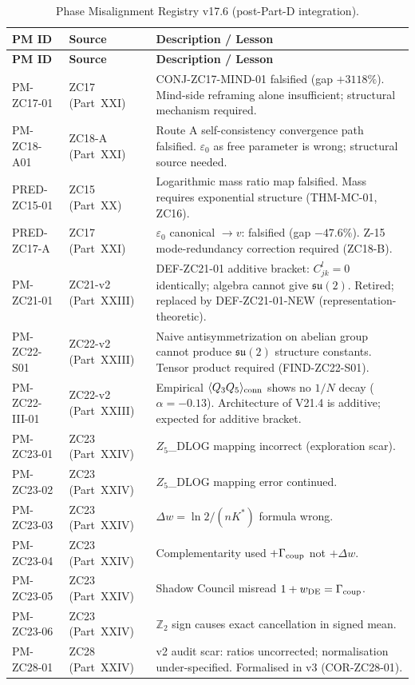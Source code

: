\documentclass[12pt, a4paper]{article}
\begin{document}
{\small
\renewcommand{\arraystretch}{1.30}
\begin{longtable}{>{\raggedright\arraybackslash}p{2.5cm}
                  >{\raggedright\arraybackslash}p{4.0cm}
                  >{\raggedright\arraybackslash}p{6.5cm}}
\caption{Phase Misalignment Registry v17.6 (post-Part-D integration).}\\
\toprule
\textbf{PM ID} & \textbf{Source} & \textbf{Description / Lesson} \\
\midrule
\endfirsthead
\toprule
\textbf{PM ID} & \textbf{Source} & \textbf{Description / Lesson} \\
\midrule
\endhead
\bottomrule
\endlastfoot
PM-ZC17-01 & ZC17 (Part~XXI) &
  CONJ-ZC17-MIND-01 falsified (gap $+3118\%$).
  Mind-side reframing alone insufficient; structural mechanism required. \\
PM-ZC18-A01 & ZC18-A (Part~XXI) &
  Route A self-consistency convergence path falsified.
  $\varepsilon_0$ as free parameter is wrong; structural source needed. \\
PRED-ZC15-01 & ZC15 (Part~XX) &
  Logarithmic mass ratio map falsified.
  Mass requires exponential structure (THM-MC-01, ZC16). \\
PRED-ZC17-A & ZC17 (Part~XXI) &
  $\varepsilon_0$ canonical $\to v$: falsified (gap $-47.6\%$).
  Z-15 mode-redundancy correction required (ZC18-B). \\
\midrule
PM-ZC21-01 & ZC21-v2 (Part~XXIII) &
  DEF-ZC21-01 additive bracket: $C_{jk}^l = 0$ identically;
  algebra cannot give $\mathfrak{su}(2)$. Retired; replaced by
  DEF-ZC21-01-NEW (representation-theoretic). \\
PM-ZC22-S01 & ZC22-v2 (Part~XXIII) &
  Naive antisymmetrization on abelian group cannot produce
  $\mathfrak{su}(2)$ structure constants. Tensor product required
  (FIND-ZC22-S01). \\
PM-ZC22-III-01 & ZC22-v2 (Part~XXIII) &
  Empirical $\langle Q_3 Q_5\rangle_{\rm conn}$ shows no $1/N$ decay
  ($\alpha = -0.13$). Architecture of V21.4 is additive; expected
  for additive bracket. \\
PM-ZC23-01 & ZC23 (Part~XXIV) &
  $Z_5$\_DLOG mapping incorrect (exploration scar). \\
PM-ZC23-02 & ZC23 (Part~XXIV) &
  $Z_5$\_DLOG mapping error continued. \\
PM-ZC23-03 & ZC23 (Part~XXIV) &
  $\Delta w = \ln 2/(nK^*)$ formula wrong. \\
PM-ZC23-04 & ZC23 (Part~XXIV) &
  Complementarity used $+\Gamma_{\rm coup}$ not $+\Delta w$. \\
PM-ZC23-05 & ZC23 (Part~XXIV) &
  Shadow Council misread $1 + w_{\rm DE} = \Gamma_{\rm coup}$. \\
PM-ZC23-06 & ZC23 (Part~XXIV) &
  $\mathbb{Z}_2$ sign causes exact cancellation in signed mean. \\
\midrule
PM-ZC28-01 & ZC28 (Part~XXIV) &
  v2 audit scar: ratios uncorrected; normalisation under-specified.
  Formalised in v3 (COR-ZC28-01). \\
\end{longtable}
}
\end{document}
